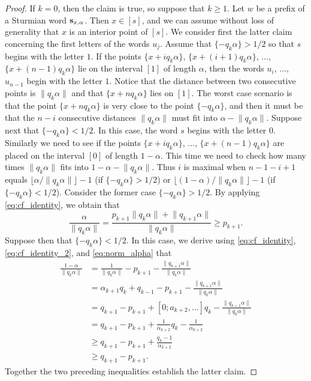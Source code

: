\documentclass[a4paper,fleqn]{article}
\providecommand{\norm}[1]{\lVert#1\rVert}
\providecommand{\floor}[1]{\lfloor#1\rfloor}
\newcommand{\infw}[1]{%
  \ifcat\noexpand#1\relax\bm{#1}%
  \else\mathbf{#1}\fi}          %
\begin{document}
  \begin{proof}
    If $k = 0$, then the claim is true, so suppose that $k \geq 1$. Let $w$ be a prefix of a Sturmian word
    $\infw{s}_{x,\alpha}$. Then $x \in [s]$, and we can assume without loss of generality that $x$ is an interior point
    of $[s]$. We consider first the latter claim concerning the first letters of the words $u_j$. Assume that
    $\{-q_k\alpha\} > 1/2$ so that $s$ begins with the letter $1$. If the points $\{x + iq_k\alpha\}$,
    $\{x + (i+1)q_k\alpha\}$, $\ldots$, $\{x + (n - 1)q_k\alpha\}$ lie on the interval $[1]$ of length $\alpha$, then
    the words $u_i$, $\ldots$, $u_{n-1}$ begin with the letter $1$. Notice that the distance between two consecutive
    points is $\norm{q_k\alpha}$ and that $\{x + nq_k\alpha\}$ lies on $[1]$. The worst case scenario is that the point
    $\{x + nq_k\alpha\}$ is very close to the point $\{-q_k\alpha\}$, and then it must be that the $n - i$ consecutive
    distances $\norm{q_k\alpha}$ must fit into $\alpha -  \norm{q_k\alpha}$. Suppose next that $\{-q_k\alpha\} < 1/2$.
    In this case, the word $s$ begins with the letter $0$. Similarly we need to see if the points $\{x + iq_k\alpha\}$,
    $\ldots$, $\{x + (n - 1)q_k\alpha\}$ are placed on the interval $[0]$ of length $1 - \alpha$. This time we need to
    check how many times $\norm{q_k\alpha}$ fits into $1 - \alpha - \norm{q_k\alpha}$. Thus $i$ is maximal when
    $n - 1 - i + 1$ equals $\floor{\alpha/\norm{q_k\alpha}} - 1$ (if $\{-q_k\alpha\} > 1/2$) or
    $\floor{(1-\alpha)/\norm{q_k\alpha}} - 1$ (if $\{-q_k\alpha\} < 1/2$). Consider the former case
    $\{-q_k\alpha\} > 1/2$. By applying \eqref{eq:cf_identity}, we obtain that
    \begin{equation*}
      \frac{\alpha}{\norm{q_k\alpha}} = \frac{p_{k+1}\norm{q_k\alpha} + \norm{q_{k+1}\alpha}}{\norm{q_k\alpha}} \geq p_{k+1}.
    \end{equation*}
    Suppose then that $\{-q_k\alpha\} < 1/2$. In this case, we derive using \eqref{eq:cf_identity},
    \eqref{eq:cf_identity_2}, and \eqref{eq:norm_alpha} that
    \begin{align*}
      \frac{1 - \alpha}{\norm{q_k\alpha}} &= \frac{1}{\norm{q_k\alpha}} - p_{k+1} - \frac{\norm{q_{k+1}\alpha}}{\norm{q_k\alpha}} \\
                                          &= \alpha_{k+1}q_k + q_{k-1} - p_{k+1} - \frac{\norm{q_{k+1}\alpha}}{\norm{q_k\alpha}} \\
                                          &= q_{k+1} - p_{k+1} + [0; a_{k+2}, \ldots]q_k - \frac{\norm{q_{k+1}\alpha}}{\norm{q_k\alpha}} \\
                                          &= q_{k+1} - p_{k+1} + \frac{1}{\alpha_{k+2}}q_k - \frac{1}{\alpha_{k+2}} \\
                                          &\geq q_{k+1} - p_{k+1} + \frac{q_k - 1}{\alpha_{k+2}} \\
                                          &\geq q_{k+1} - p_{k+1}.
    \end{align*}
    Together the two preceding inequalities establish the latter claim.


\end{proof}
\end{document}
